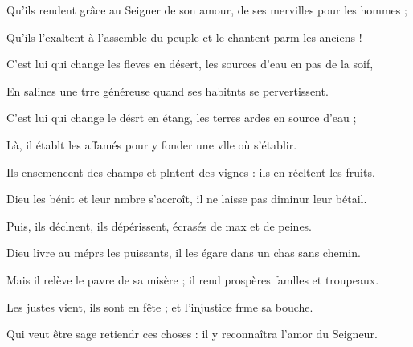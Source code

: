 \item Qu’ils rendent grâce au Seigner de son amour,\psstar{} de ses mervilles pour les hommes ;
\item Qu’ils l’exaltent à l’assemble du peuple\psstar{} et le chantent parm les anciens !
\item C’est lui qui change les fleves en désert,\psstar{} les sources d’eau en pas de la soif,
\item En salines une trre généreuse\psstar{} quand ses habitnts se pervertissent.
\item C’est lui qui change le désrt en étang,\psstar{} les terres ardes en source d’eau ;
\item Là, il établt les affamés\psstar{} pour y fonder une vlle où s’établir.
\item Ils ensemencent des champs et plntent des vignes :\psstar{} ils en récltent les fruits.
\item Dieu les bénit et leur nmbre s’accroît,\psstar{} il ne laisse pas diminur leur bétail.
\item Puis, ils déclnent, ils dépérissent,\psstar{} écrasés de max et de peines.
\item Dieu livre au méprs les puissants,\psstar{} il les égare dans un chas sans chemin.
\item Mais il relève le pavre de sa misère ;\psstar{} il rend prospères famlles et troupeaux.
\item Les justes vient, ils sont en fête ;\psstar{} et l’injustice frme sa bouche.
\item Qui veut être sage retiendr ces choses :\psstar{} il y reconnaîtra l’amor du Seigneur.